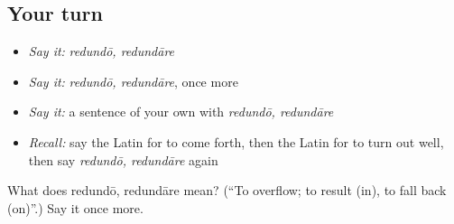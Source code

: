 \subsection*{Your turn}
\begin{itemize}
\raggedright
  \item \emph{Say it:} \emph{redundō, redundāre}
  \item \emph{Say it:} \emph{redundō, redundāre}, once more
  \item \emph{Say it:} a sentence of your own with \emph{redundō, redundāre}
  \item \emph{Recall:} say the Latin for to come forth, then the Latin for to turn out well, then say \emph{redundō, redundāre} again
\end{itemize}

\begin{tcolorbox}[breakable,colback=teal!4,colframe=teal!35!black,title={Before you move on}]
What does redundō, redundāre mean? (\textquotedblleft{}To overflow; to result (in), to fall back (on)\textquotedblright{}.) Say it once more.
\end{tcolorbox}
